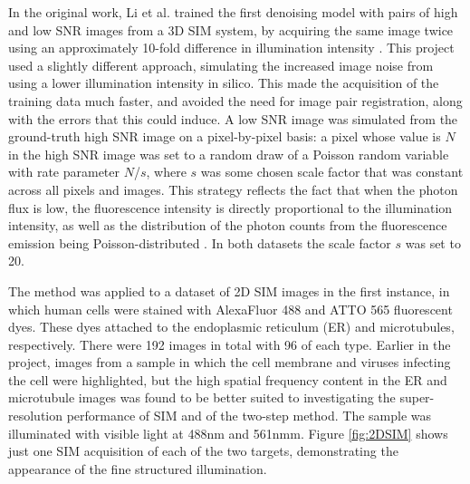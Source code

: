 \documentclass[12pt]{article}
\begin{document}
In the original work, Li et al. trained the first denoising model with pairs of high and low SNR images from a 3D SIM system,
by acquiring the same image twice using an approximately 10-fold difference in illumination intensity \cite{keypaper}.
This project used a slightly different approach,
simulating the increased image noise from using a lower illumination intensity in silico.
This made the acquisition of the training data much faster,
and avoided the need for image pair registration, along with the errors that this could induce.
A low SNR image was simulated from the ground-truth high SNR image on a pixel-by-pixel basis:
a pixel whose value is $N$ in the high SNR image was set to a random draw of a Poisson random variable with rate parameter $N$/$s$,
where $s$ was some chosen scale factor that was constant across all pixels and images.
This strategy reflects the fact that when the photon flux is low,
the fluorescence intensity is directly proportional to the illumination intensity,
as well as the distribution of the photon counts from the fluorescence emission being Poisson-distributed \cite{fluorescence}.
In both datasets the scale factor $s$ was set to 20.

The method was applied to a dataset of 2D SIM images in the first instance,
in which human cells were stained with AlexaFluor 488 and ATTO 565 fluorescent dyes.
These dyes attached to the endoplasmic reticulum (ER) and microtubules, respectively.
There were 192 images in total with 96 of each type.
Earlier in the project, images from a sample in which the cell membrane and viruses infecting the cell were highlighted,
but the high spatial frequency content in the ER and microtubule images was found to be better suited to investigating the super-resolution performance of SIM and of the two-step method.
The sample was illuminated with visible light at 488nm and 561nmm.
Figure \ref{fig:2DSIM} shows just one SIM acquisition of each of the two targets,
demonstrating the appearance of the fine structured illumination.
\end{document}
